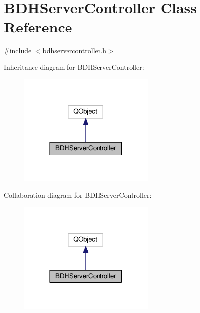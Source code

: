 \hypertarget{class_b_d_h_server_controller}{}\section{B\+D\+H\+Server\+Controller Class Reference}
\label{class_b_d_h_server_controller}


{\ttfamily \#include $<$bdhservercontroller.\+h$>$}



Inheritance diagram for B\+D\+H\+Server\+Controller\+:
\nopagebreak
\begin{figure}[H]
\begin{center}
\leavevmode
\includegraphics[width=189pt]{class_b_d_h_server_controller__inherit__graph}
\end{center}
\end{figure}


Collaboration diagram for B\+D\+H\+Server\+Controller\+:
\nopagebreak
\begin{figure}[H]
\begin{center}
\leavevmode
\includegraphics[width=189pt]{class_b_d_h_server_controller__coll__graph}
\end{center}
\end{figure}
